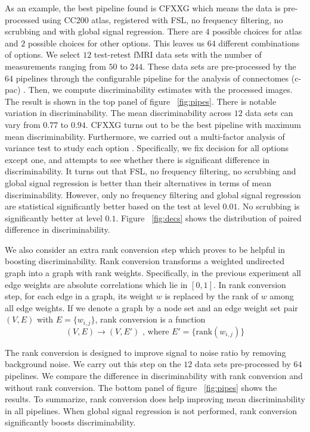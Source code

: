 \documentclass{article}
\begin{document}
As an example, the best pipeline found is CFXXG which means the data is pre-processed using CC200 atlas, registered with FSL, no frequency filtering, no scrubbing and with global signal regression. There are $4$ possible choices for atlas and $2$ possible choices for other options. This leaves us $64$ different combinations of options. We select $12$ test-retest fMRI data sets with the number of measurements ranging from $50$ to $244$. These data sets are pre-processed by the $64$ pipelines through the configurable pipeline for the analysis of connectomes (c-pac) \cite{sikka2014towards}. Then, we compute discriminability estimates with the processed images. The result is shown in the top panel of figure ~\ref{fig:pipes}. There is notable variation in discriminability. The mean discriminability across $12$ data sets can vary from $0.77$ to $0.94$. CFXXG turns out to be the best pipeline with maximum mean discriminability. Furthermore, we carried out a multi-factor analysis of variance test to study each option \cite{hair2009multivariate}. Specifically, we fix decision for all options except one, and attempts to see whether there is significant difference in discriminability. It turns out that FSL, no frequency filtering, no scrubbing and global signal regression is better than their alternatives in terms of mean discriminability. However, only no frequency filtering and global signal regression are statistical significantly better based on the test at level $0.01$. No scrubbing is significantly better at level $0.1$. Figure ~\ref{fig:decs} shows the distribution of paired difference in discriminability.

We also consider an extra rank conversion step which proves to be helpful in boosting discriminability. Rank conversion transforms a weighted undirected graph into a graph with rank weights. Specifically, in the previous experiment all edge weights are absolute correlations which lie in $[0,1]$. In rank conversion step, for each edge in a graph, its weight $w$ is replaced by the rank of $w$ among all edge weights. If we denote a graph by a node set and an edge weight set pair $(V,E)$ with $E=\{w_{i,j}\}$, rank conversion is a function
\[(V,E) \rightarrow (V,E') \text{ , where } E'= \{\text{rank}(w_{i,j})\} \]

The rank conversion is designed to improve signal to noise ratio by removing background noise. We carry out this step on the $12$ data sets pre-processed by $64$ pipelines. We compare the difference in discriminability with rank conversion and without rank conversion. The bottom panel of figure ~\ref{fig:pipes} shows the results. To summarize, rank conversion does help improving mean discriminability in all pipelines. When global signal regression is not performed, rank conversion significantly boosts discriminability. 
\end{document}
